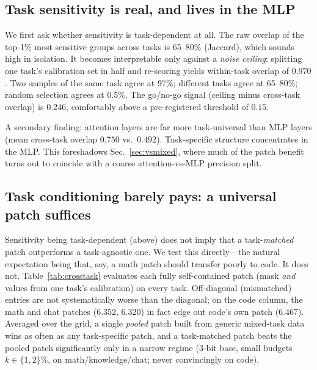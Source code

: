 \documentclass[manuscript, screen, review]{jair}
\begin{document}
\subsection{Task sensitivity is real, and lives in the MLP}
\label{sec:atlas}
We first ask whether sensitivity is task-dependent at all. The raw overlap of
the top-1\% most sensitive groups across tasks is 65--80\% (Jaccard), which
sounds high in isolation. It becomes interpretable only against a
\emph{noise ceiling}: splitting one task's calibration set in half and
re-scoring yields within-task overlap of $0.970$. Two samples of the same task
agree at 97\%; different tasks agree at 65--80\%; random selection agrees at
$0.5\%$. The go/no-go signal (ceiling minus cross-task overlap) is $0.246$,
comfortably above a pre-registered threshold of $0.15$.

A secondary finding: attention layers are far more task-universal than MLP
layers (mean cross-task overlap $0.750$ vs.\ $0.492$). Task-specific structure
concentrates in the MLP. This foreshadows Sec.~\ref{sec:vsmixed}, where
much of the patch benefit turns out to coincide with a coarse
attention-vs-MLP precision split.

\subsection{Task conditioning barely pays: a universal patch suffices}
\label{sec:crosstask}
Sensitivity being task-dependent (above) does not imply that a task-\emph{matched}
patch outperforms a task-agnostic one. We test this directly---the natural
expectation being that, say, a math patch should transfer poorly to code. It
does not. Table~\ref{tab:crosstask} evaluates each fully self-contained patch
(mask \emph{and} values from one task's calibration) on every task. Off-diagonal
(mismatched) entries are not systematically worse than the diagonal; on the code
column, the math and chat patches (6.352, 6.320) in fact edge out code's own
patch (6.467). Averaged over the grid, a single \emph{pooled} patch built from
generic mixed-task data wins as often as any task-specific patch, and a
task-matched patch beats the pooled patch significantly only in a narrow regime
(3-bit base, small budgets $k\!\in\!\{1,2\}\%$, on math/knowledge/chat; never
convincingly on code).
\end{document}
